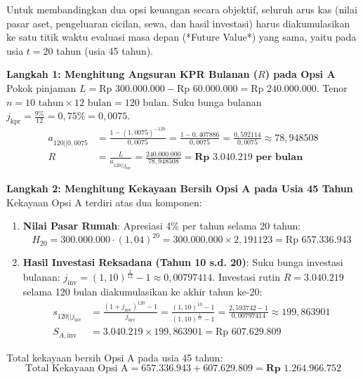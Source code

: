 \documentclass[11pt,a4paper]{article}
\newcommand{\angl}[1]{\overline{#1|}}
\begin{document}
\begin{solusibox}[6]
\begin{konsepbox}
Untuk membandingkan dua opsi keuangan secara objektif, seluruh arus kas (nilai pasar aset, pengeluaran cicilan, sewa, dan hasil investasi) harus diakumulasikan ke satu titik waktu evaluasi masa depan (*Future Value*) yang sama, yaitu pada usia $t = 20$ tahun (usia 45 tahun).
\end{konsepbox}

\textbf{Langkah 1: Menghitung Angsuran KPR Bulanan ($R$) pada Opsi A}  
Pokok pinjaman $L = \text{Rp } 300.000.000 - \text{Rp } 60.000.000 = \text{Rp } 240.000.000$.  
Tenor $n = 10 \text{ tahun} \times 12 \text{ bulan} = 120 \text{ bulan}$. Suku bunga bulanan $j_{\text{kpr}} = \frac{9\%}{12} = 0{,}75\% = 0{,}0075$.
\begin{align*}
    a_{\angl{120}|0{,}0075} &= \frac{1 - (1{,}0075)^{-120}}{0{,}0075} = \frac{1 - 0{,}407886}{0{,}0075} = \frac{0{,}592114}{0{,}0075} \approx 78{,}948508 \\
    R &= \frac{L}{a_{\angl{120}|j_{\text{kpr}}}} = \frac{240.000.000}{78{,}948508} = \mathbf{\text{Rp } 3.040.219 \text{ per bulan}}
\end{align*}

\textbf{Langkah 2: Menghitung Kekayaan Bersih Opsi A pada Usia 45 Tahun}  
Kekayaan Opsi A terdiri atas dua komponen:
\begin{enumerate}[leftmargin=4mm, topsep=1pt, itemsep=1pt]
    \item \textbf{Nilai Pasar Rumah}: Apresiasi 4\% per tahun selama 20 tahun:
    $$H_{20} = 300.000.000 \cdot (1{,}04)^{20} = 300.000.000 \times 2{,}191123 = \text{Rp } 657.336.943$$
    \item \textbf{Hasil Investasi Reksadana (Tahun 10 s.d. 20)}:  
    Suku bunga investasi bulanan: $j_{\text{inv}} = (1{,}10)^{\frac{1}{12}} - 1 \approx 0{,}00797414$.  
    Investasi rutin $R = 3.040.219$ selama 120 bulan diakumulasikan ke akhir tahun ke-20:
    \begin{align*}
        s_{\angl{120}|j_{\text{inv}}} &= \frac{(1 + j_{\text{inv}})^{120} - 1}{j_{\text{inv}}} = \frac{(1{,}10)^{10} - 1}{(1{,}10)^{\frac{1}{12}} - 1} = \frac{2{,}593742 - 1}{0{,}00797414} \approx 199{,}863901 \\
        S_{A, \text{inv}} &= 3.040.219 \times 199{,}863901 = \text{Rp } 607.629.809
    \end{align*}
\end{enumerate}
Total kekayaan bersih Opsi A pada usia 45 tahun:
$$\text{Total Kekayaan Opsi A} = 657.336.943 + 607.629.809 = \mathbf{\text{Rp } 1.264.966.752}$$


\end{solusibox}
\end{document}
